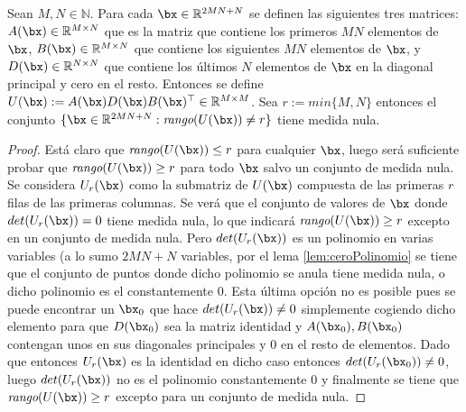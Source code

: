 \begin{lema} \label{lema:aux1}
Sean $M,N\in\mathbb{N}$. Para cada $\bx\in\mathbb{R}^{2MN+N}$ se definen las siguientes tres matrices:
$A(\bx)\in\mathbb{R}^{M\times N}$ que es la matriz que contiene los primeros $MN$ elementos de $\bx$, $B(\bx)\in\mathbb{R}^{M \times N}$ que contiene los siguientes $MN$ elementos de $\bx$, y $D(\bx)\in\mathbb{R}^{N\times N}$ que contiene los últimos $N$ elementos de $\bx$ en la diagonal principal y cero en el resto. Entonces se define $U(\bx):=A(\bx)D(\bx)B(\bx)^\top \in \mathbb{R}^{M\times M}$. Sea $r:=min\{M,N\}$ entonces el conjunto $\{\bx\in\mathbb{R}^{2MN+N} : \textit{rango}(U(\bx)) \neq r \}$ tiene medida nula.
\end{lema}
\begin{proof}
Está claro que $\textit{rango}(U(\bx)) \leq r$ para cualquier $\bx$, luego será suficiente probar que $\textit{rango}(U(\bx)) \geq r$ para todo $\bx$ salvo un conjunto de medida nula. Se considera $U_r(\bx)$ como la submatriz de $U(\bx)$ compuesta de las primeras $r$ filas de las primeras columnas. Se verá que el conjunto de valores de $\bx$ donde $det(U_r(\bx)) = 0$ tiene medida nula, lo que indicará $\textit{rango}(U(\bx)) \geq r$ excepto en un conjunto de medida nula. Pero $det(U_r(\bx))$ es un polinomio en varias variables (a lo sumo $2MN+N$ variables, por el lema \ref{lem:ceroPolinomio} se tiene que el conjunto de puntos donde dicho polinomio se anula tiene medida nula, o dicho polinomio es el constantemente $0$. Esta última opción no es posible pues se puede encontrar un $\bx_0$ que hace $det(U_r(\bx)) \neq 0$ simplemente cogiendo dicho elemento para que $D(\bx_0)$ sea la matriz identidad y $A(\bx_0),B(\bx_0)$ contengan unos en sus diagonales principales y $0$ en el resto de elementos. Dado que entonces $U_r(\bx)$ es la identidad en dicho caso entonces $det(U_r(\bx_0)) \neq 0$, luego $det(U_r(\bx))$ no es el polinomio constantemente $0$ y finalmente se tiene que $\textit{rango}(U(\bx)) \geq r$ excepto para un conjunto de medida nula. 
\end{proof}


